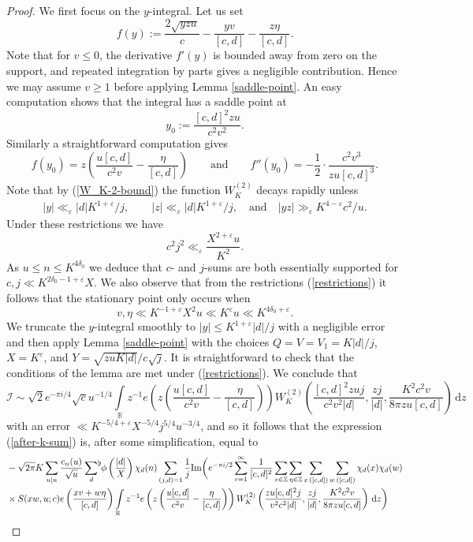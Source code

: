 \documentclass[a4paper,10pt,twoside]{amsart}
\theoremstyle{definition}
\numberwithin{equation}{section}
\newcommand\R{\mathbb{R}}
\newcommand\Z{\mathbb{Z}}
\newcommand\eps{\varepsilon}
\renewcommand{\Im}{\textnormal{Im}}
\renewcommand\:{\colon}
\newcommand{\sumflat}{\mathop{{\sum}^{\raisebox{-3pt}{\makebox[0pt][l]{$\flat$}}}}}
\begin{document}
\begin{proof}
We first focus on the $y$-integral. Let us set
\[ 
f(y):=\frac{2\sqrt{yzu}}{c}-\frac{yv}{[c,d]}-\frac{z\eta}{[c,d]}.\]
Note that for $v\leq 0$, the derivative $f'(y)$ is bounded away from zero on the support, and repeated integration by parts gives a negligible contribution. Hence we may assume $v\geq 1$ before applying Lemma \ref{saddle-point}. An easy computation shows that the integral has a saddle point at
\[y_0:=\frac{[c,d]^2zu}{c^2v^2}.\]
Similarly a straightforward computation gives 
\[f(y_0)=z\left(\frac{u[c,d]}{c^2v}-\frac{\eta}{[c,d]}\right)\qquad\text{and}\qquad f''(y_0)=-\frac12\cdot\frac{c^2v^3}{zu[c,d]^3}.\]
Note that by (\ref{W_K-2-bound}) the function $W_K^{(2)}$ decays rapidly unless 
\begin{align}\label{restrictions}
|y|\ll_\eps |d|K^{1+\eps}/j,\qquad |z|\ll_\eps |d|K^{1+\eps}/j, \quad\text{and}\quad |yz|\gg_\eps K^{4-\eps}c^2/u.
\end{align}
Under these restrictions we have 
\[ 
c^2j^2\ll_\eps \frac{X^{2+\eps}u}{K^2}.
\]
As $u\leq n\leq K^{4\delta_0}$ we deduce that $c$- and $j$-sums are both essentially supported for $c,j\ll K^{2\delta_0-1+\eps}X$. We also observe that from the restrictions (\ref{restrictions}) it follows that the stationary point only occurs when 
\[
v,\eta\ll K^{-1+\eps}X^2 u \ll K^\eps u \ll K^{4\delta_0+\eps}.   
\]
We truncate the $y$-integral smoothly to $|y|\leq K^{1+\eps}|d|/j$ with a negligible error and then apply Lemma \ref{saddle-point} with the choices $Q=V=V_1=K|d|/j$, $X=K^\eps$, and $Y=\sqrt{zuK|d|}/c\sqrt j$. It is straightforward to check that the conditions of the lemma are met under (\ref{restrictions}). We conclude that 
\[ 
\mathcal I\sim\sqrt 2e^{-\pi i/4}\sqrt c u^{-1/4}\int\limits_{\R}z^{-1}e\left( z\left(\frac{u[c,d]}{c^2v}-\frac\eta{[c,d]}\right)\right)W_K^{(2)}\left(\frac{[c,d]^2zuj}{c^2v^2|d|},\frac{zj}{|d|},\frac{K^2c^2v}{8\pi zu[c,d]}\right)\,\mathrm d z
\]
with an error $\ll K^{-5/4+\eps}X^{-5/4}j^{5/4}u^{-3/4}$, and so it follows that the expression (\ref{after-k-sum}) is, after some simplification, equal to
\begin{align}\label{off-diagonal-intermediate}
&-\sqrt{2\pi}K\sum_{u|n}\frac{c_n(u)}{\sqrt u}\sumflat_d\,\phi\left(\frac{|d|}X\right)\chi_d(n)\sum_{(j,d)=1}\frac1{j}\Im\bigg(e^{-\pi i/2}\sum_{c=1}^\infty\frac1{[c,d]^2} \sum_{v\in\Z}\sum_{\eta\in\Z}\sum_{x\,([c,d])}\sum_{w\,([c,d])}\chi_d(x)\chi_d(w)\nonumber\\
& \times S(xw,u;c)e\left(\frac{xv+w\eta}{[c,d]}\right)\int\limits_{\mathbb R}z^{-1}e\left(z\left(\frac{u[c,d]}{c^2v}-\frac\eta{[c,d]}\right)\right)W_K^{(2)}\left(\frac{zu[c,d]^2j}{v^2c^2|d|},\frac{zj}{|d|},\frac{K^2c^2v}{8\pi zu[c,d]}\right)\,\mathrm d z\bigg)\\

\end{align}
\end{proof}
\end{document}
